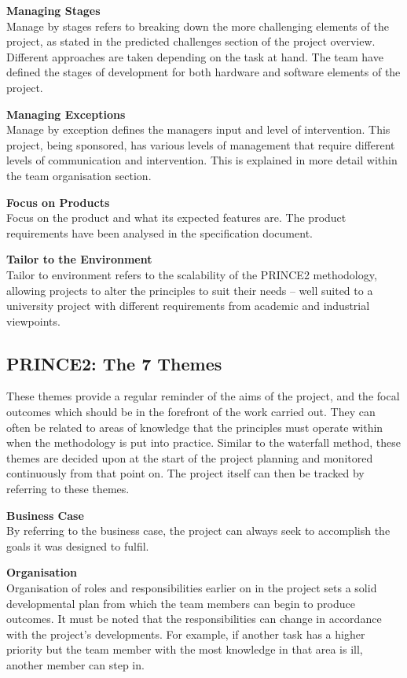 \documentclass [12pt]{article}
\begin{document}
\textbf{Managing Stages} \\
Manage by stages refers to breaking down the more challenging elements of the project, as stated in the predicted challenges section of the project overview. Different approaches are taken depending on the task at hand. The team have defined the stages of development for both hardware and software elements of the project.

\textbf{Managing Exceptions}\\
Manage by exception defines the managers input and level of intervention. This project, being sponsored, has various levels of management that require different levels of communication and intervention. This is explained in more detail within the team organisation section.

\textbf{Focus on Products}\\
Focus on the product and what its expected features are. The product requirements have been analysed in the specification document.

\textbf{Tailor to the Environment}\\
Tailor to environment refers to the scalability of the PRINCE2 methodology, allowing projects to alter the principles to suit their needs – well suited to a university project with different requirements from academic and industrial viewpoints.

\subsection{PRINCE2: The 7 Themes}\label{sec:7_themes}
These themes provide a regular reminder of the aims of the project, and the focal outcomes which should be in the forefront of the work carried out. They can often be related to areas of knowledge that the principles must operate within when the methodology is put into practice. Similar to the waterfall method, these themes are decided upon at the start of the project planning and monitored continuously from that point on. The project itself can then be tracked by referring to these themes.

\textbf{Business Case}\\
By referring to the business case, the project can always seek to accomplish the goals it was designed to fulfil.

\textbf{Organisation}\\
Organisation of roles and responsibilities earlier on in the project sets a solid developmental plan from which the team members can begin to produce outcomes. It must be noted that the responsibilities can change in accordance with the project’s developments. For example, if another task has a higher priority but the team member with the most knowledge in that area is ill, another member can step in.
\end{document}
